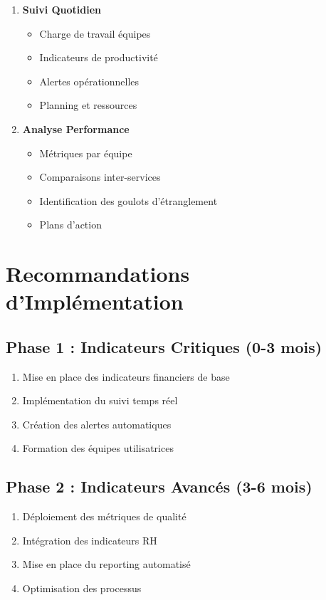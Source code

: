 \documentclass[12pt,a4paper]{article}
\begin{document}
\begin{enumerate}
    \item \textbf{Suivi Quotidien}
    \begin{itemize}
        \item Charge de travail équipes
        \item Indicateurs de productivité
        \item Alertes opérationnelles
        \item Planning et ressources
    \end{itemize}
    
    \item \textbf{Analyse Performance}
    \begin{itemize}
        \item Métriques par équipe
        \item Comparaisons inter-services
        \item Identification des goulots d'étranglement
        \item Plans d'action
    \end{itemize}
\end{enumerate}

\section{Recommandations d'Implémentation}

\subsection{Phase 1 : Indicateurs Critiques (0-3 mois)}

\begin{enumerate}
    \item Mise en place des indicateurs financiers de base
    \item Implémentation du suivi temps réel
    \item Création des alertes automatiques
    \item Formation des équipes utilisatrices
\end{enumerate}

\subsection{Phase 2 : Indicateurs Avancés (3-6 mois)}

\begin{enumerate}
    \item Déploiement des métriques de qualité
    \item Intégration des indicateurs RH
    \item Mise en place du reporting automatisé
    \item Optimisation des processus
\end{enumerate}
\end{document}
